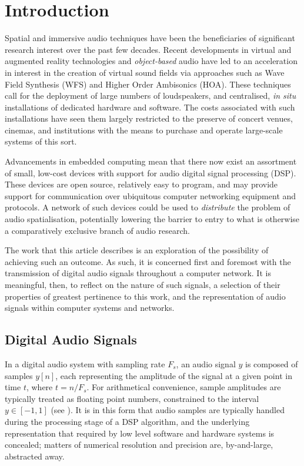 \section{Introduction}\label{sec:intro}

Spatial and immersive audio techniques have been the beneficiaries of
significant research interest over the past few decades.
Recent developments in virtual and augmented reality technologies and
\textit{object-based} audio have led to an acceleration in interest in the
creation of virtual sound fields via approaches such as Wave Field Synthesis
(WFS) and Higher Order Ambisonics (HOA)\cite{berkhout_acoustic_1993,
    ahrens_theory_2008,daniel_further_2003,frank_producing_2015}.
These techniques call for the deployment of large numbers of loudspeakers, and
centralised, \textit{in situ} installations of dedicated hardware and software.
The costs associated with such installations have seen them largely restricted
to the preserve of concert venues, cinemas, and institutions with the means to
purchase and operate large-scale systems of this sort.

Advancements in embedded computing mean that there now exist an assortment of
small, low-cost devices with support for audio digital signal processing (DSP).
These devices are open source, relatively easy to program, and may provide
support for communication over ubiquitous computer networking equipment and
protocols.
A network of such devices could be used to \textit{distribute} the problem of
audio spatialisation, potentially lowering the barrier to entry to what is
otherwise a comparatively exclusive branch of audio research.

The work that this article describes is an exploration of the possibility of
achieving such an outcome.
As such, it is concerned first and foremost with the transmission of digital
audio signals throughout a computer network.
It is meaningful, then, to reflect on the nature of such signals, a selection
of their properties of greatest pertinence to this work, and the representation
of audio signals within computer systems and networks.

\subsection{Digital Audio Signals}
\label{subsec:digital-audio-signals}

In a digital audio system with sampling rate $F_s$, an audio signal $y$ is
composed of samples $y[n]$, each representing the amplitude of the signal at a
given point in time $t$, where $t = n/F_s$.
For arithmetical convenience, sample amplitudes are typically treated as
floating point numbers, constrained to the interval $y \in [-1, 1]$ (see
).
It is in this form that audio samples are typically handled during the
processing stage of a DSP algorithm, and the underlying representation
\textemdash{} that required by low level software and hardware systems
\textemdash{} is concealed; matters of numerical resolution and precision are,
by-and-large, abstracted away.

